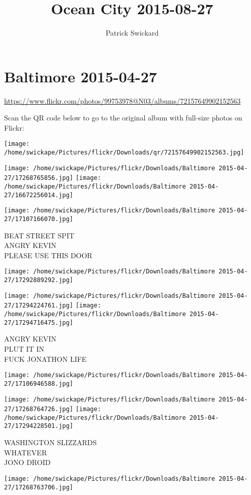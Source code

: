 \documentclass[10pt,letterpaper]{article}
\title{Ocean City 2015-08-27}
\author{Patrick Swickard}
\date{}
\begin{document}
\section*{Baltimore 2015-04-27}

\url{https://www.flickr.com/photos/99753978@N03/albums/72157649902152563}

Scan the QR code below to go to the original album with full-size photos on Flickr:

\texttt{[image: /home/swickape/Pictures/flickr/Downloads/qr/72157649902152563.jpg]}
\pagebreak

\texttt{[image: /home/swickape/Pictures/flickr/Downloads/Baltimore 2015-04-27/17268765856.jpg]}
\texttt{[image: /home/swickape/Pictures/flickr/Downloads/Baltimore 2015-04-27/16672256014.jpg]}

\texttt{[image: /home/swickape/Pictures/flickr/Downloads/Baltimore 2015-04-27/17107166070.jpg]}

BEAT STREET SPIT\\
ANGRY KEVIN\\
PLEASE USE THIS DOOR
\pagebreak

\texttt{[image: /home/swickape/Pictures/flickr/Downloads/Baltimore 2015-04-27/17292889292.jpg]}

\vspace{0.25in}
\texttt{[image: /home/swickape/Pictures/flickr/Downloads/Baltimore 2015-04-27/17294224761.jpg]}
\texttt{[image: /home/swickape/Pictures/flickr/Downloads/Baltimore 2015-04-27/17294716475.jpg]}

ANGRY KEVIN\\
PLUT IT IN\\
FUCK JONATHON LIFE
\pagebreak

\texttt{[image: /home/swickape/Pictures/flickr/Downloads/Baltimore 2015-04-27/17106946588.jpg]}

\vspace{0.25in}
\texttt{[image: /home/swickape/Pictures/flickr/Downloads/Baltimore 2015-04-27/17268764726.jpg]}
\texttt{[image: /home/swickape/Pictures/flickr/Downloads/Baltimore 2015-04-27/17294228501.jpg]}

WASHINGTON SLIZZARDS\\
WHATEVER\\
JONO DROID
\pagebreak

\texttt{[image: /home/swickape/Pictures/flickr/Downloads/Baltimore 2015-04-27/17268763706.jpg]}
\end{document}
